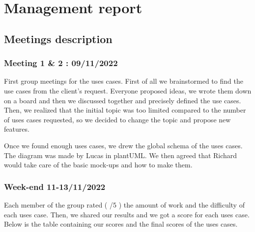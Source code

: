 \part{Management report}
\chapter{Meetings description}
\section{Meeting 1 \& 2 : 09/11/2022}
First group meetings for the uses cases. First of all we brainstormed to find the use cases from the client's request. Everyone proposed ideas, we wrote them down on a board and then we discussed together and precisely defined the use cases. Then, we realized that the initial topic was too limited compared to the number of uses cases requested, so we decided to change the topic and propose new features.

Once we found enough uses cases, we drew the global schema of the uses cases. The diagram was made by Lucas in plantUML. We then agreed that Richard would take care of the basic mock-ups and how to make them.

\section{Week-end 11-13/11/2022}
Each member of the group rated ( /5 ) the amount of work and the difficulty of each uses case. Then, we shared our results and we got a score for each uses case. Below is the table containing our scores and the final scores of the uses cases.

